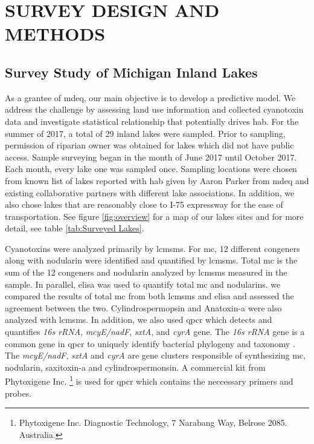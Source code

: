\chapter{SURVEY DESIGN AND METHODS}
\section{Survey Study of Michigan Inland Lakes} 
As a grantee of \gls{mdeq}, our main objective is to develop a predictive model. We address the challenge by assessing land use information and collected cyanotoxin data and investigate statistical relationship that potentially drives \gls{hab}. For the summer of 2017, a total of 29 inland lakes were sampled. Prior to sampling, permission of riparian owner was obtained for lakes which did not have public access. Sample surveying began in the month of June 2017 until October 2017. Each month, every lake one was sampled once. Sampling locations were chosen from known list of lakes reported with \gls{hab} given by Aaron Parker from \gls{mdeq} and existing collaborative partners with different lake associations. In addition, we also chose lakes that are reasonably close to I-75 expressway for the ease of transportation. See figure \ref{fig:overview} for a map of our lakes sites and for more detail, see table \ref{tab:Surveyed Lakes}.

Cyanotoxins were analyzed primarily by \gls{lcmsms}. For \gls{mc}, 12 different congeners along with nodularin were identified and quantified by \gls{lcmsms}. Total \gls{mc} is the sum of the 12 congeners and nodularin analyzed by \gls{lcmsms} measured in the sample. In parallel, \gls{elisa} was used to quantify total \gls{mc} and nodularins.  we compared the results of total \gls{mc} from both \gls{lcmsms} and \gls{elisa} and assessed the agreement between the two. Cylindrospermopsin and Anatoxin-a were also analyzed with \gls{lcmsms}. In addition, we also used \gls{qpcr} which detects and quantifies \emph{16s rRNA}, \emph{mcyE/nadF}, \emph{sxtA}, and \emph{cyrA} gene. The \emph{16s rRNA} gene is a common gene in \gls{qpcr} to uniquely identify bacterial phylogeny and taxonomy \cite{janda_16s_2007}.  The \emph{mcyE/nadF}, \emph{sxtA} and \emph{cyrA} are gene clusters responsible of synthesizing \gls{mc}, nodularin, saxitoxin-a and cylindrospermonsin. A commercial kit from Phytoxigene Inc. \footnote{Phytoxigene Inc. Diagnostic Technology, 7 Narabang Way, Belrose 2085. Australia.} is used for \gls{qpcr} which contains the neccessary primers and probes.  

